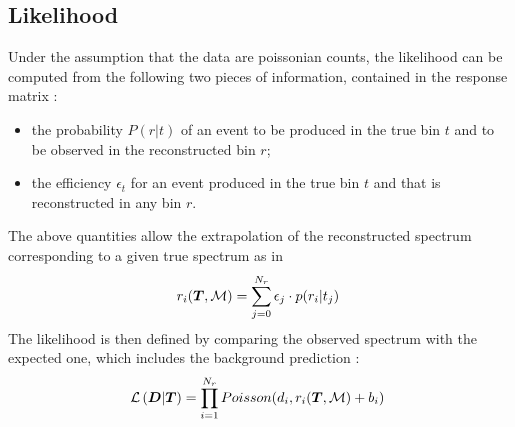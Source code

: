 \subsection{Likelihood}
\label{sec:fbullhood}
Under the assumption that the data are poissonian counts, the
likelihood \conditionalLhood{\Data{}}{\Truth{},\TrasfMatrix{}} can be
computed from the following two pieces of information, contained in
the response matrix \TrasfMatrix{}:
\begin{itemize}
\item the probability $P(r|t)$ of an event to be
  produced in the true bin $t$ and to be observed in the reconstructed
  bin $r$;
\item the efficiency $\epsilon{}_t$ for an event produced in the
  true bin $t$ and that is reconstructed in any bin $r$.
\end{itemize}
The above quantities allow the extrapolation of the reconstructed spectrum
\Reco{} corresponding to a given true spectrum \Truth{} as in
\begin{equation}
r_i(\boldsymbol{T}{},\mathcal{M}{}) = \sum_{j=0}^{N_r}\epsilon_j\cdot{}p(r_i|t_j)\phantom{.}
\end{equation}
The likelihood is then defined by comparing the observed spectrum
\Data{} with the expected one, which includes the background
prediction \Bckg{}:
\begin{equation}
\mathcal{L}\left(\boldsymbol{D}{}|\boldsymbol{T}{}\right) =
\prod_{i=1}^{N_r}Poisson(d_i,r_i(\boldsymbol{T}{},\mathcal{M}{})+b_i)\phantom{.}
\end{equation}


